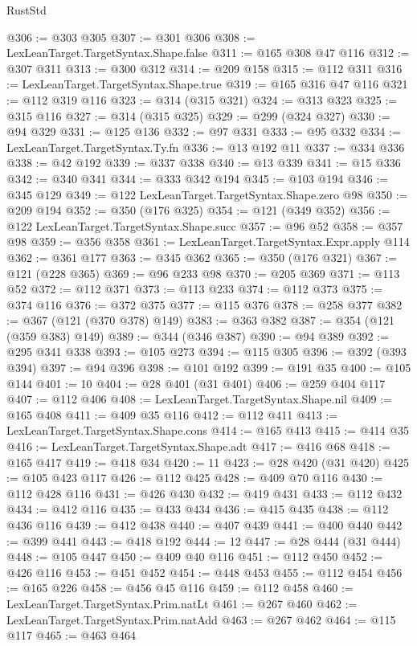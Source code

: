 \begin{lexlean}{RustStd}
\begin{coremodule}
{\begin{coremodule}
{{{{{{{{{{{{{{{{{{{{{{{{{{{{{{{{{{{{{{{{{{{{@306 := @303 @305
@307 := @301 @306
@308 := LexLeanTarget.TargetSyntax.Shape.false
@311 := @165 @308 @47 @116
@312 := @307 @311
@313 := @300 @312
@314 := @209 @158
@315 := @112 @311
@316 := LexLeanTarget.TargetSyntax.Shape.true
@319 := @165 @316 @47 @116
@321 := @112 @319 @116
@323 := @314 (@315 @321)
@324 := @313 @323
@325 := @315 @116
@327 := @314 (@315 @325)
@329 := @299 (@324 @327)
@330 := @94 @329
@331 := @125 @136
@332 := @97 @331
@333 := @95 @332
@334 := LexLeanTarget.TargetSyntax.Ty.fn
@336 := @13 @192 @11
@337 := @334 @336
@338 := @42 @192
@339 := @337 @338
@340 := @13 @339
@341 := @15 @336
@342 := @340 @341
@344 := @333 @342 @194
@345 := @103 @194
@346 := @345 @129
@349 := @122 LexLeanTarget.TargetSyntax.Shape.zero @98
@350 := @209 @194
@352 := @350 (@176 @325)
@354 := @121 (@349 @352)
@356 := @122 LexLeanTarget.TargetSyntax.Shape.succ
@357 := @96 @52
@358 := @357 @98
@359 := @356 @358
@361 := LexLeanTarget.TargetSyntax.Expr.apply @114
@362 := @361 @177
@363 := @345 @362
@365 := @350 (@176 @321)
@367 := @121 (@228 @365)
@369 := @96 @233 @98
@370 := @205 @369
@371 := @113 @52
@372 := @112 @371
@373 := @113 @233
@374 := @112 @373
@375 := @374 @116
@376 := @372 @375
@377 := @115 @376
@378 := @258 @377
@382 := @367 (@121 (@370 @378) @149)
@383 := @363 @382
@387 := @354 (@121 (@359 @383) @149)
@389 := @344 (@346 @387)
@390 := @94 @389
@392 := @295 @341 @338
@393 := @105 @273
@394 := @115 @305
@396 := @392 (@393 @394)
@397 := @94 @396
@398 := @101 @192
@399 := @191 @35
@400 := @105 @144
@401 := 10
@404 := @28 @401 (@31 @401)
@406 := @259 @404 @117
@407 := @112 @406
@408 := LexLeanTarget.TargetSyntax.Shape.nil
@409 := @165 @408
@411 := @409 @35 @116
@412 := @112 @411
@413 := LexLeanTarget.TargetSyntax.Shape.cons
@414 := @165 @413
@415 := @414 @35
@416 := LexLeanTarget.TargetSyntax.Shape.adt
@417 := @416 @68
@418 := @165 @417
@419 := @418 @34
@420 := 11
@423 := @28 @420 (@31 @420)
@425 := @105 @423 @117
@426 := @112 @425
@428 := @409 @70 @116
@430 := @112 @428 @116
@431 := @426 @430
@432 := @419 @431
@433 := @112 @432
@434 := @412 @116
@435 := @433 @434
@436 := @415 @435
@438 := @112 @436 @116
@439 := @412 @438
@440 := @407 @439
@441 := @400 @440
@442 := @399 @441
@443 := @418 @192
@444 := 12
@447 := @28 @444 (@31 @444)
@448 := @105 @447
@450 := @409 @40 @116
@451 := @112 @450
@452 := @426 @116
@453 := @451 @452
@454 := @448 @453
@455 := @112 @454
@456 := @165 @226
@458 := @456 @45 @116
@459 := @112 @458
@460 := LexLeanTarget.TargetSyntax.Prim.natLt
@461 := @267 @460
@462 := LexLeanTarget.TargetSyntax.Prim.natAdd
@463 := @267 @462
@464 := @115 @117
@465 := @463 @464
}}}}}}}}}}}}}}}}}}}}}}}}}}}}}}}}}}}}}}}}}}}}
\end{coremodule}}
\end{coremodule}
\end{lexlean}
